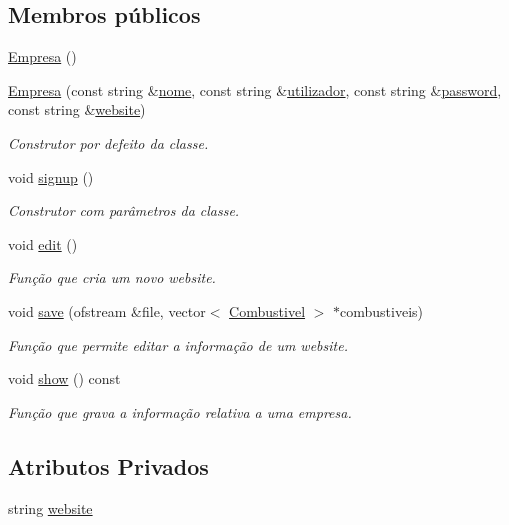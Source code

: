 \subsection*{Membros públicos}
\begin{DoxyCompactItemize}
\item 
\hyperlink{class_empresa_aff124b958356c479ab50ddf4cf302193}{Empresa} ()
\item 
\hyperlink{class_empresa_a8d57f5422b13a48395f63d82a51bede5}{Empresa} (const string \&\hyperlink{class_membro_a2598bbe34ae32a98f41468b2202a9555}{nome}, const string \&\hyperlink{class_membro_a42cc733ff94ec8d1bbfdacc62dfbb0e7}{utilizador}, const string \&\hyperlink{class_membro_ae2b12fc3e91efc674c07e735edf4ac21}{password}, const string \&\hyperlink{class_empresa_a809624b98d1db18f8627ce2fa394dddd}{website})
\begin{DoxyCompactList}\small\item\em Construtor por defeito da classe. \end{DoxyCompactList}\item 
void \hyperlink{class_empresa_a93293b79b5b56973c3a3d3880d325c14}{signup} ()
\begin{DoxyCompactList}\small\item\em Construtor com parâmetros da classe. \end{DoxyCompactList}\item 
void \hyperlink{class_empresa_a97feeb44a837e086f7aa92f8c9a1ea10}{edit} ()
\begin{DoxyCompactList}\small\item\em Função que cria um novo website. \end{DoxyCompactList}\item 
void \hyperlink{class_empresa_a508c9c178a2933255eadc7955d3f8089}{save} (ofstream \&file, vector$<$ \hyperlink{class_combustivel}{Combustivel} $>$ $\ast$combustiveis)
\begin{DoxyCompactList}\small\item\em Função que permite editar a informação de um website. \end{DoxyCompactList}\item 
void \hyperlink{class_empresa_a707dc497843f63a2d094fb6871fa5b7d}{show} () const 
\begin{DoxyCompactList}\small\item\em Função que grava a informação relativa a uma empresa. \end{DoxyCompactList}\end{DoxyCompactItemize}
\subsection*{Atributos Privados}
\begin{DoxyCompactItemize}
\item 
string \hyperlink{class_empresa_a809624b98d1db18f8627ce2fa394dddd}{website}
\end{DoxyCompactItemize}
